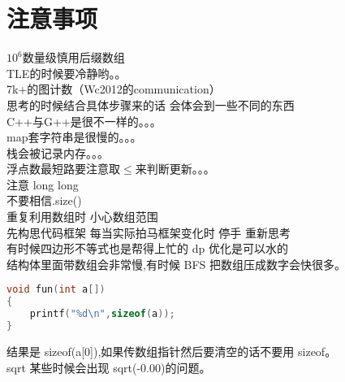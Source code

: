 \section{注意事项}
    $10^{6}$数量级慎用后缀数组\\
    TLE的时候要冷静哟。。\\
    7k+的图计数（Wc2012的communication）\\
    思考的时候结合具体步骤来的话 会体会到一些不同的东西\\
    C++与G++是很不一样的。。。\\
    map套字符串是很慢的。。。\\ 
    栈会被记录内存。。。\\
    浮点数最短路要注意取$\leq$来判断更新。。。\\
    注意 long long\\
    不要相信.size()\\
    重复利用数组时 小心数组范围\\
    先构思代码框架 每当实际拍马框架变化时 停手 重新思考\\
    有时候四边形不等式也是帮得上忙的 dp 优化是可以水的\\
    结构体里面带数组会非常慢,有时候 BFS 把数组压成数字会快很多。\\
    \begin{lstlisting}[language=c++]
void fun(int a[])
{
    printf("%d\n",sizeof(a));
}
    \end{lstlisting}
    结果是 sizeof(a[0]),如果传数组指针然后要清空的话不要用 sizeof。\\
    sqrt 某些时候会出现 sqrt(-0.00)的问题。\\
